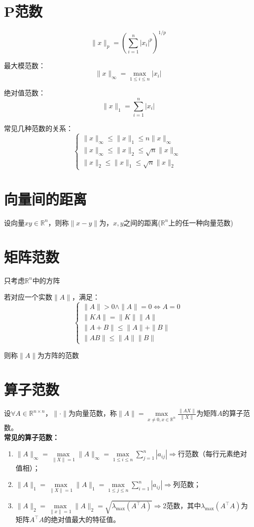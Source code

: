 \documentclass[UTF8,a4paper,11pt,oneside]{ctexbook}
\begin{document}
\section{P范数}
\[
\|x\|_p=\left(\sum_{i=1}^n|x_i|^p\right)^{1/p}
\]

最大模范数：
\[
\|x\|_\infty=\max_{1\leq i\leq n}|x_i|
\]

绝对值范数：
\[
\|x\|_1=\sum_{i=1}^n|x_i|
\]

常见几种范数的关系：
\[
\begin{cases}
    \|x\|_\infty\leq\|x\|_1\leq n\|x\|_\infty\\
    \|x\|_\infty\leq\|x\|_2\leq\sqrt{n}\|x\|_\infty\\
    \|x\|_2\leq\|x\|_1\leq\sqrt{n}\|x\|_2
\end{cases}
\]

\section{向量间的距离}

设向量\(xy\in\mathbb{R}^n\)，则称\(\|x-y\|\)为，\(x,y\)之间的距离(\(\mathbb{R}^n\)上的任一种向量范数)

\section{矩阵范数}

只考虑\(\mathbb{R}^n\)中的方阵

若对应一个实数\(\|A\|\)，满足：
\[
\begin{cases}
    \|A\|>0\wedge\|A\|=0\Leftrightarrow A=0\\
    \|KA\|=\|K\|\|A\|\\
    \|A+B\|\leq\|A\|+\|B\|\\
    \|AB\|\leq\|A\|\|B\|
\end{cases}
\]

则称\(\|A\|\)为方阵的范数

\section{算子范数}

设\(\forall A\in\mathbb{R}^{n\times n}\)，\(\|\cdot\|\)为向量范数，称\(\|A\|=\max\limits_{x\neq0,x\in\mathbb{R}^n}\frac{\|AX\|}{\|X\|}\)为矩阵\(A\)的算子范数。\\
\textbf{常见的算子范数：}
\begin{enumerate}
    \item \(\|A\|_\infty=\max\limits_{\|X\|=1}\|A\|_\infty=\max\limits_{1\leq i\leq n}\sum\limits_{j=1}^n|a_{ij}|\Rightarrow\)行范数（每行元素绝对值相）；
    \item \(\|A\|_1=\max\limits_{\|X\|=1}\|A\|_1=\max\limits_{1\leq j\leq n}\sum\limits_{i=1}^n|a_{ij}|\Rightarrow\)列范数；
    \item \(\|A\|_2=\max\limits_{\|x\|=1}\|A\|_2=\sqrt{\lambda_{\max}(A^\top A)}\Rightarrow\)2范数，其中\(\lambda_{\max}(A^\top A)\)为矩阵\(A^\top A\)的绝对值最大的特征值。
\end{enumerate}
\end{document}
